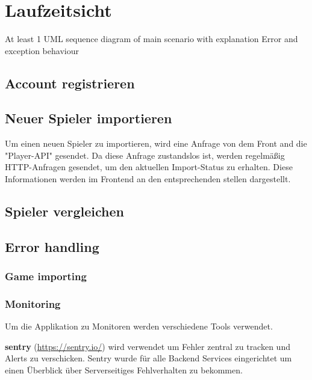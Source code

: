 \section{Laufzeitsicht}
At least 1 UML sequence diagram of main scenario with explanation
Error and exception behaviour
\subsection{Account registrieren}

\subsection{Neuer Spieler importieren}

Um einen neuen Spieler zu importieren, wird eine Anfrage von dem Front and die "Player-API" gesendet. Da diese Anfrage zustandslos ist, werden regelmäßig HTTP-Anfragen gesendet, um den aktuellen Import-Status 
zu erhalten. Diese Informationen werden im Frontend an den entsprechenden stellen dargestellt.


\subsection{Spieler vergleichen}

\subsection{Error handling}
\subsubsection{Game importing}
\subsubsection{Monitoring}

Um die Applikation zu Monitoren werden verschiedene Tools verwendet.

\textbf{sentry} (\href{https://sentry.io/}{https://sentry.io/}) wird verwendet um Fehler zentral zu tracken und
Alerts zu verschicken.
Sentry wurde für alle Backend Services eingerichtet um einen Überblick über Serverseitiges Fehlverhalten zu bekommen.


